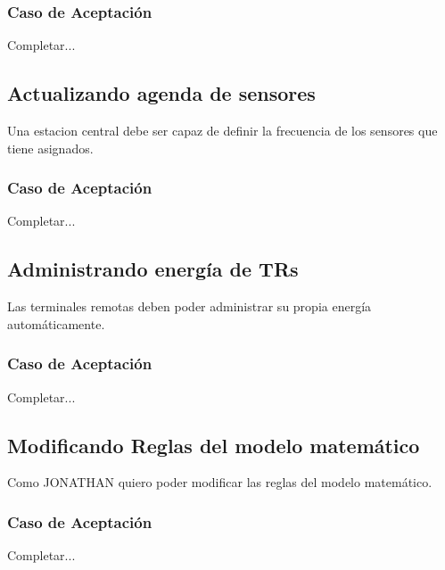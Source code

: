 \subsubsection*{Caso de Aceptación}
Completar...

\linea \subsection*{Actualizando agenda de sensores}
Una estacion central debe ser capaz de definir la frecuencia de los sensores que tiene asignados.
\subsubsection*{Caso de Aceptación}
Completar...

\linea \subsection*{Administrando energía de TRs}
Las terminales remotas deben poder administrar su propia energía automáticamente.
\subsubsection*{Caso de Aceptación}
Completar...

\linea \subsection*{Modificando Reglas del modelo matemático}
Como JONATHAN quiero poder modificar las reglas del modelo matemático.
\subsubsection*{Caso de Aceptación}
Completar...

